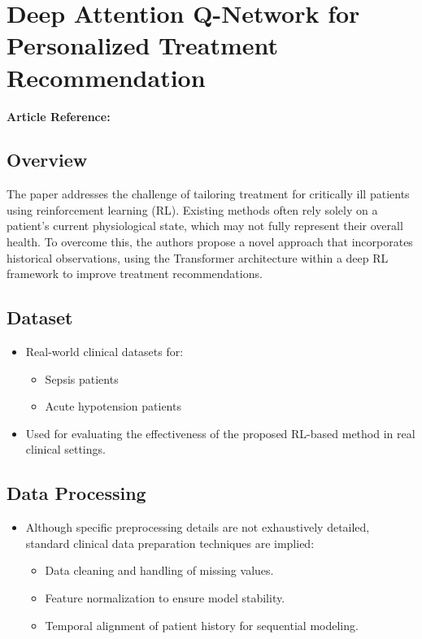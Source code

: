 \section{Deep Attention Q-Network for Personalized Treatment Recommendation}
\textbf{Article Reference:} \cite{article_16}

\subsection*{Overview}
The paper  addresses the challenge of tailoring treatment for critically ill patients using reinforcement learning (RL). Existing methods often rely solely on a patient's current physiological state, which may not fully represent their overall health. To overcome this, the authors propose a novel approach that incorporates historical observations, using the Transformer architecture within a deep RL framework to improve treatment recommendations.

\subsection*{Dataset}
\begin{itemize}
    \item Real-world clinical datasets for:
    \begin{itemize}
        \item Sepsis patients
        \item Acute hypotension patients
    \end{itemize}
    \item Used for evaluating the effectiveness of the proposed RL-based method in real clinical settings.
\end{itemize}

\subsection*{Data Processing}
\begin{itemize}
    \item Although specific preprocessing details are not exhaustively detailed, standard clinical data preparation techniques are implied:
    \begin{itemize}
        \item Data cleaning and handling of missing values.
        \item Feature normalization to ensure model stability.
        \item Temporal alignment of patient history for sequential modeling.
    \end{itemize}
\end{itemize}

